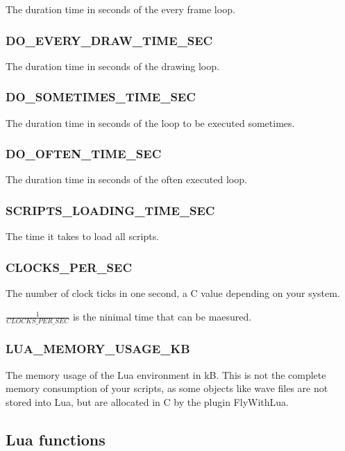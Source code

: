 \documentclass[11pt,parskip=half,a4paper]{scrartcl}
\begin{document}
The duration time in seconds of the every frame loop.

\subsubsection{DO\_EVERY\_DRAW\_TIME\_SEC}

The duration time in seconds of the drawing loop.

\subsubsection{DO\_SOMETIMES\_TIME\_SEC}

The duration time in seconds of the loop to be executed sometimes.

\subsubsection{DO\_OFTEN\_TIME\_SEC}

The duration time in seconds of the often executed loop.

\subsubsection{SCRIPTS\_LOADING\_TIME\_SEC}

The time it takes to load all scripts.

\subsubsection{CLOCKS\_PER\_SEC}

The number of clock ticks in one second, a C value depending on your system.

$\frac{1}{CLOCKS\_PER\_SEC}$ is the ninimal time that can be maesured.

\subsubsection{LUA\_MEMORY\_USAGE\_KB}

The memory usage of the Lua environment in kB. This is not the complete memory consumption of your scripts, as some objects like wave files are not stored into Lua, but are allocated in C by the plugin FlyWithLua.

\newpage
\subsection{Lua functions}
\end{document}
